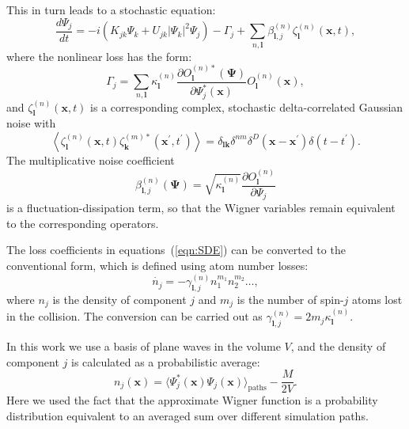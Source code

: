 \documentclass[aps,prl,twocolumn,showpacs,amsmath,amssymb,superscriptaddress,flushbottom,noraggedfooter]{revtex4-1}
\newcommand{\xvec}{\boldsymbol{x}}
\newcommand{\kvec}{\boldsymbol{k}}
\newcommand{\lvec}{\boldsymbol{l}}
\newcommand{\Psivec}{\boldsymbol{\Psi}}
\begin{document}
This in turn leads to a stochastic equation:
\begin{equation}
\label{eqn:SDE}
	\frac{d\Psi_j}{dt} =
		- i\left( K_{jk} \Psi_k + U_{jk} \lvert \Psi_k \rvert^{2} \Psi_j \right)
		- \Gamma_j
		+ \sum_{n,\lvec} \beta_{\lvec,j}^{(n)} \zeta_{\lvec}^{(n)}(\xvec,t),
\end{equation}
where the nonlinear loss has the form:
\begin{equation}
	\Gamma_j = \sum_{n,\lvec}
		\kappa_{\lvec}^{(n)}
		\frac{\partial O_{\lvec}^{(n)*} (\Psivec)}{\partial\Psi_j^{*} (\xvec)}
		O_{\lvec}^{(n)}(\xvec),
\end{equation}
and $\zeta_{\lvec}^{(n)}(\xvec, t)$ is a corresponding complex,
stochastic delta-correlated Gaussian noise with
\begin{equation}
	\left\langle
		\zeta_{\lvec}^{(n)} (\xvec,t) \zeta_{\kvec}^{(m)*}(\xvec^\prime, t^\prime)
	\right\rangle =
	\delta_{\lvec \kvec} \delta^{nm} \delta^{D} \left(
		\xvec - \xvec^\prime
	\right)
	\delta \left( t - t^\prime \right).
\end{equation}
The multiplicative noise coefficient
\begin{equation}
	\beta_{\lvec,j}^{(n)} \left( \Psivec \right) =
	\sqrt{\kappa_{\lvec}^{(n)}}
	\frac{\partial O_{\lvec}^{(n)}}{\partial\Psi_j}
\end{equation}
is a fluctuation-dissipation term,
so that the Wigner variables remain equivalent to the corresponding operators.

The loss coefficients in equations~(\ref{eqn:SDE}) can be converted to the conventional form,
which is defined using atom number losses:
\begin{equation}
	\dot{n_j} = - \gamma^{(n)}_{\lvec,j} n^{m_1}_1 n^{m_2}_2 \ldots ,
\end{equation}
where $n_j$ is the density of component $j$ and $m_j$
is the number of spin-$j$ atoms lost in the collision.
The conversion can be carried out as $\gamma^{(n)}_{\lvec,j} = 2 m_j \kappa^{(n)}_{\lvec}$.

In this work we use a basis of plane waves in the volume $V$,
and the density of component $j$ is calculated as a probabilistic average:
\begin{equation}
\label{eqn:wigner-density}
	n_j (\xvec)
		= \langle \Psi^*_j (\xvec) \Psi_j (\xvec) \rangle_{\mathrm{paths}} - \frac{M}{2V}.
\end{equation}
Here we used the fact that the approximate Wigner function is a probability distribution
equivalent to an averaged sum over different simulation paths.
\end{document}
